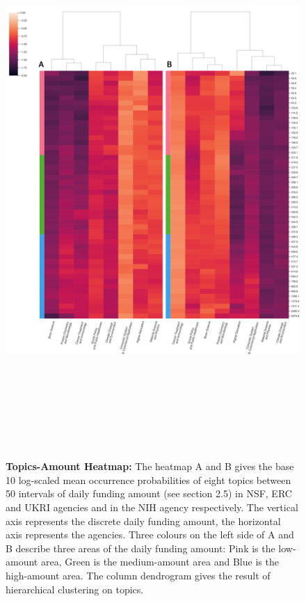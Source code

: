 \begin{figure}[H]
    \centering
    \includegraphics[width = 16cm, height = 21cm]{./img/heatmap_amount_topics.pdf}
    \caption[Heatmaps between topics and 50 intervals of discrete funding amount]{\textbf{Topics-Amount Heatmap:} The heatmap A and B gives the base 10 log-scaled mean occurrence probabilities of eight topics between 50 intervals of daily funding amount (see section 2.5) in NSF, ERC and UKRI agencies and in the NIH agency respectively. The vertical axis represents the discrete daily funding amount, the horizontal axis represents the agencies. Three colours on the left side of A and B describe three areas of the daily funding amount: Pink is the low-amount area, Green is the medium-amount area and Blue is the high-amount area. The column dendrogram gives the result of hierarchical clustering on topics.}
\end{figure}

